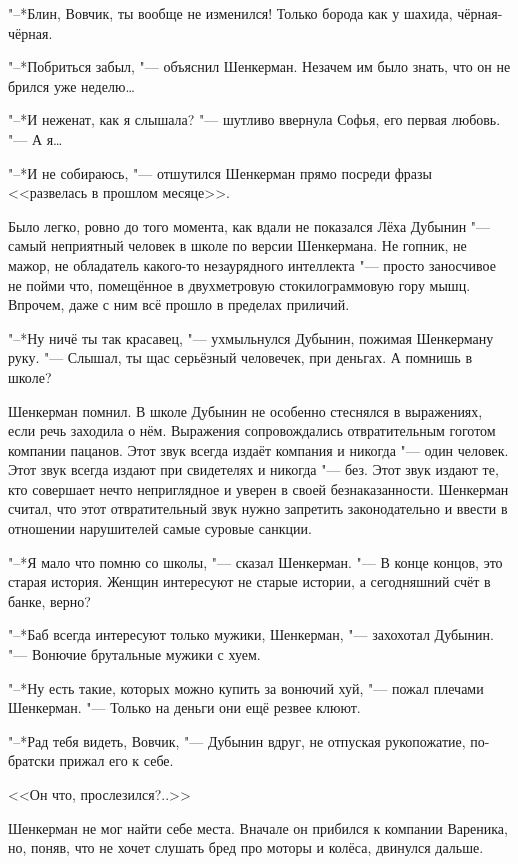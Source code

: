 "--*Блин, Вовчик, ты вообще не изменился!
Только борода как у шахида, чёрная-чёрная.

"--*Побриться забыл, "--- объяснил Шенкерман.
Незачем им было знать, что он не брился уже неделю\ldots{}

"--*И неженат, как я слышала? "--- шутливо ввернула Софья, его первая любовь.
"--- А я\ldots{}

"--*И не собираюсь, "--- отшутился Шенкерман прямо посреди фразы <<развелась в прошлом месяце>>.

Было легко, ровно до того момента, как вдали не показался Лёха Дубынин "--- самый неприятный человек в школе по версии Шенкермана.
Не гопник, не мажор, не обладатель какого-то незаурядного интеллекта "--- просто заносчивое не пойми что, помещённое в двухметровую стокилограммовую гору мышц.
Впрочем, даже с ним всё прошло в пределах приличий.

"--*Ну ничё ты так красавец, "--- ухмыльнулся Дубынин, пожимая Шенкерману руку.
"--- Слышал, ты щас серьёзный человечек, при деньгах.
А помнишь в школе?

Шенкерман помнил.
В школе Дубынин не особенно стеснялся в выражениях, если речь заходила о нём.
Выражения сопровождались отвратительным гоготом компании пацанов.
Этот звук всегда издаёт компания и никогда "--- один человек.
Этот звук всегда издают при свидетелях и никогда "--- без.
Этот звук издают те, кто совершает нечто неприглядное и уверен в своей безнаказанности.
Шенкерман считал, что этот отвратительный звук нужно запретить законодательно и ввести в отношении нарушителей самые суровые санкции.

"--*Я мало что помню со школы, "--- сказал Шенкерман.
"--- В конце концов, это старая история.
Женщин интересуют не старые истории, а сегодняшний счёт в банке, верно?

"--*Баб всегда интересуют только мужики, Шенкерман, "--- захохотал Дубынин.
"--- Вонючие брутальные мужики с хуем.

"--*Ну есть такие, которых можно купить за вонючий хуй, "--- пожал плечами Шенкерман.
"--- Только на деньги они ещё резвее клюют.

"--*Рад тебя видеть, Вовчик, "--- Дубынин вдруг, не отпуская рукопожатие, по-братски прижал его к себе.

<<Он что, прослезился?..>>

\asterism

\textspace

Шенкерман не мог найти себе места.
Вначале он прибился к компании Вареника, но, поняв, что не хочет слушать бред про моторы и колёса, двинулся дальше.

